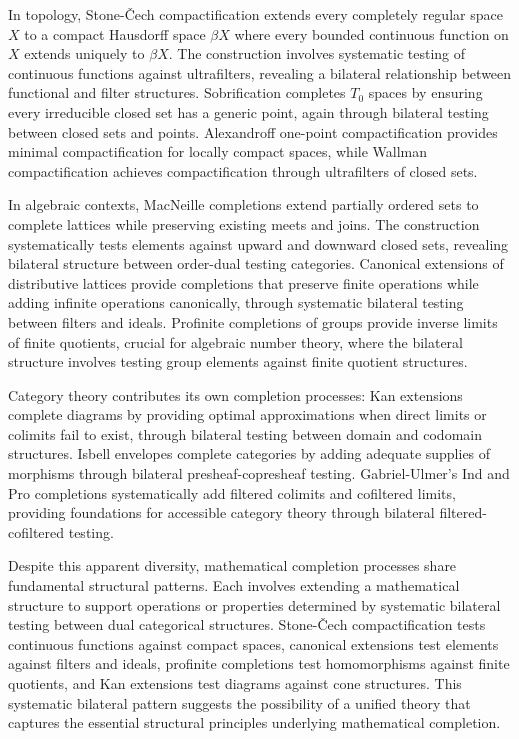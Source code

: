 \documentclass[11pt]{article}
\theoremstyle{plain}
\theoremstyle{definition}
\theoremstyle{remark}
\begin{document}
In topology, Stone-\v{C}ech compactification \cite{stone1936theory} extends every completely regular space $X$ to a compact Hausdorff space $\beta X$ where every bounded continuous function on $X$ extends uniquely to $\beta X$. The construction involves systematic testing of continuous functions against ultrafilters, revealing a bilateral relationship between functional and filter structures. Sobrification \cite{johnstone1982stone} completes $T_0$ spaces by ensuring every irreducible closed set has a generic point, again through bilateral testing between closed sets and points. Alexandroff one-point compactification \cite{alexandroff1924point} provides minimal compactification for locally compact spaces, while Wallman compactification \cite{wallman1938lattices} achieves compactification through ultrafilters of closed sets.

In algebraic contexts, MacNeille completions \cite{macneille1937extension} extend partially ordered sets to complete lattices while preserving existing meets and joins. The construction systematically tests elements against upward and downward closed sets, revealing bilateral structure between order-dual testing categories. Canonical extensions of distributive lattices \cite{jonsson1951boolean} provide completions that preserve finite operations while adding infinite operations canonically, through systematic bilateral testing between filters and ideals. Profinite completions \cite{pontryagin1966topological} of groups provide inverse limits of finite quotients, crucial for algebraic number theory, where the bilateral structure involves testing group elements against finite quotient structures.

Category theory contributes its own completion processes: Kan extensions \cite{kan1958adjoint} complete diagrams by providing optimal approximations when direct limits or colimits fail to exist, through bilateral testing between domain and codomain structures. Isbell envelopes \cite{isbell1960adequate} complete categories by adding adequate supplies of morphisms through bilateral presheaf-copresheaf testing. Gabriel-Ulmer's Ind and Pro completions \cite{gabriel1971categories} systematically add filtered colimits and cofiltered limits, providing foundations for accessible category theory through bilateral filtered-cofiltered testing.

Despite this apparent diversity, mathematical completion processes share fundamental structural patterns. Each involves extending a mathematical structure to support operations or properties determined by systematic bilateral testing between dual categorical structures. Stone-\v{C}ech compactification tests continuous functions against compact spaces, canonical extensions test elements against filters and ideals, profinite completions test homomorphisms against finite quotients, and Kan extensions test diagrams against cone structures. This systematic bilateral pattern suggests the possibility of a unified theory that captures the essential structural principles underlying mathematical completion.
\end{document}
